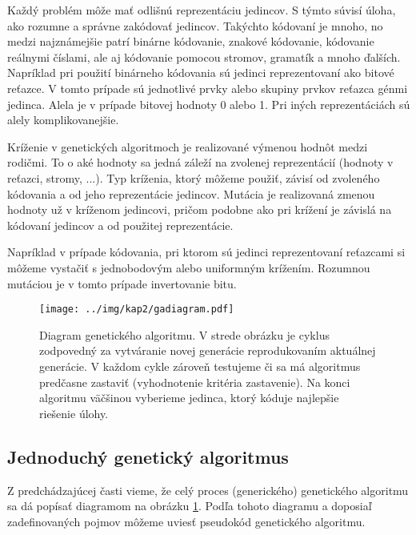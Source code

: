Každý problém môže mať odlišnú reprezentáciu jedincov. S týmto súvisí úloha, ako rozumne a správne zakódovať jedincov. Takýchto kódovaní je mnoho, no medzi najznámejšie patrí binárne kódovanie, znakové kódovanie, kódovanie reálnymi číslami, ale aj kódovanie pomocou stromov, gramatík a mnoho ďalších. Napríklad pri použití binárneho kódovania sú jedinci reprezentovaní ako bitové reťazce. V tomto prípade sú jednotlivé prvky alebo skupiny prvkov reťazca génmi jedinca. Alela je v prípade bitovej hodnoty 0 alebo 1. Pri iných reprezentáciách sú alely komplikovanejšie.

Kríženie v genetických algoritmoch je realizované výmenou hodnôt medzi rodičmi. To o aké hodnoty sa jedná záleží na zvolenej reprezentácií (hodnoty v reťazci, stromy, ...). Typ kríženia, ktorý môžeme použiť, závisí od zvoleného kódovania a od jeho reprezentácie jedincov. 
Mutácia je realizovaná zmenou hodnoty už v kríženom jedincovi, pričom podobne ako pri krížení je závislá na kódovaní jedincov a od použitej reprezentácie. 

Napríklad v prípade kódovania, pri ktorom sú jedinci reprezentovaní reťazcami si môžeme vystačiť s jednobodovým alebo uniformným krížením. Rozumnou mutáciou je v tomto prípade invertovanie bitu.

\begin{figure}[h]
\centering
\centerline{\mbox{\texttt{[image: ../img/kap2/gadiagram.pdf]}}}
\caption{Diagram genetického algoritmu. V strede obrázku je cyklus zodpovedný za vytváranie novej generácie reprodukovaním aktuálnej generácie. V každom cykle zároveň testujeme či sa má algoritmus predčasne zastaviť (vyhodnotenie kritéria zastavenie). Na konci algoritmu väčšinou vyberieme jedinca, ktorý kóduje najlepšie riešenie úlohy.}\label{fig:GAdiagram}
\end{figure}

\subsection{Jednoduchý genetický algoritmus}\label{kap2:2.1:2.1.3:SimpleGeneticAlgo}
Z predchádzajúcej časti vieme, že celý proces (generického) genetického algoritmu sa dá popísať diagramom na obrázku \ref{fig:GAdiagram}. Podľa tohoto diagramu a doposiaľ zadefinovaných pojmov môžeme uviesť pseudokód genetického algoritmu.


